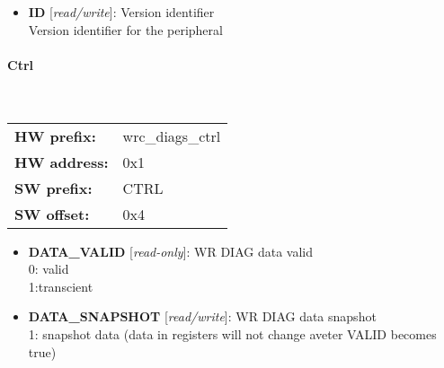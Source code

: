 \begin{itemize}
\item \begin{small}
{\bf 
ID
} [\emph{read/write}]: Version identifier
\\
Version identifier for the peripheral
\end{small}
\end{itemize}
\paragraph*{Ctrl}\mbox{}\\\vskip 6pt
\begin{tabular}{l l }
{\bf HW prefix:}  & wrc\_diags\_ctrl\\
{\bf HW address:}  & 0x1\\
{\bf SW prefix:}  & CTRL\\
{\bf SW offset:}  & 0x4\\
\end{tabular}


\vspace{12pt}
\noindent
{}

\begin{itemize}
\item \begin{small}
{\bf 
DATA\_VALID
} [\emph{read-only}]: WR DIAG data valid
\\
0: valid\\                     1:transcient
\end{small}
\item \begin{small}
{\bf 
DATA\_SNAPSHOT
} [\emph{read/write}]: WR DIAG data snapshot
\\
1: snapshot data (data in registers will not change aveter VALID becomes true)
\end{small}
\end{itemize}
